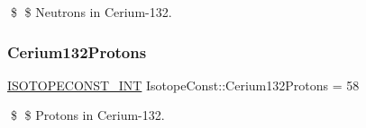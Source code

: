 \$ \$ Neutrons in Cerium-\/132. \mbox{\label{group___isotope_const-_cerium-_ce132_ga794a9421282067b0f8c36e22efdc3831}} 
\subsubsection{\texorpdfstring{Cerium132\+Protons}{Cerium132Protons}}
{\footnotesize\ttfamily \mbox{\hyperlink{group___isotope_const-_macros_ga5f18360b3e99483a35c32d789e62621c}{I\+S\+O\+T\+O\+P\+E\+C\+O\+N\+S\+T\+\_\+\+I\+NT}} Isotope\+Const\+::\+Cerium132\+Protons = 58}

\$ \$ Protons in Cerium-\/132. 